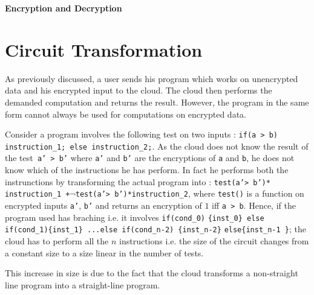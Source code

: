 \documentclass{acm_proc_article-sp}
\begin{document}
\textbf{Encryption and Decryption}\\

\section{Circuit Transformation}
As previously discussed, a user sends his program which works on unencrypted data and his encrypted input to the cloud. The cloud then performs the demanded computation and returns the result. However, the program in the same form cannot always be used for computations on encrypted data. 

Consider a program involves the following test on two inputs : \texttt{if(a > b) instruction\_1; else instruction\_2;}. As the cloud does not know the result of the test\texttt{ a' > b'} where \texttt{a'} and \texttt{b'} are the encryptions of \texttt{a} and \texttt{b}, he does not know which of the instructions he has perform. In fact he performs both the instrunctions by transforming the actual program into : \texttt{test(a'> b')*} \texttt{instruction\_1 +}$\neg$\texttt{test(a'> b')*instruction\_2}, where \texttt{test()}  is a function on encrypted inputs \texttt{a'}, \texttt{b'} and returns an encryption of $1$ iff \texttt{a > b}. Hence, if the program used has braching i.e. it involves \texttt{if(cond\_0)} \texttt{\{inst\_0\} else if(cond\_1)\{inst\_1\}}\linebreak \texttt{ ...else if(cond\_n-2) \{inst\_n-2\}} \texttt{else\{inst\_n-1 \}}; the cloud has to perform all the $n$ instructions i.e. the size of the circuit changes from a constant size to a size linear in the number of tests.

This increase in size is due to the fact that the cloud transforms a non-straight line program into a straight-line program.
\end{document}
